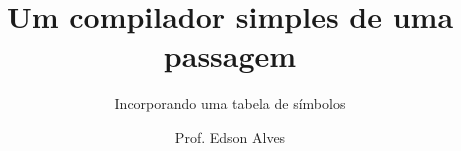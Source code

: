 \title{Um compilador simples de uma passagem}
\subtitle{Incorporando uma tabela de símbolos}
\date{}
\author{Prof. Edson Alves}
